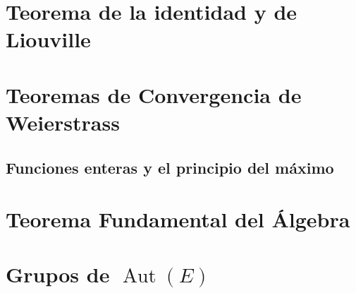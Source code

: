 \documentclass{report}
\begin{document}
\chapter{Teorema de la identidad  y de Liouville}
\chapter{Teoremas de Convergencia de Weierstrass}
\section{Funciones enteras y el principio del máximo}
\chapter{Teorema Fundamental del Álgebra}
\chapter{Grupos de $\operatorname{Aut}\left(E\right)$}
\end{document}
